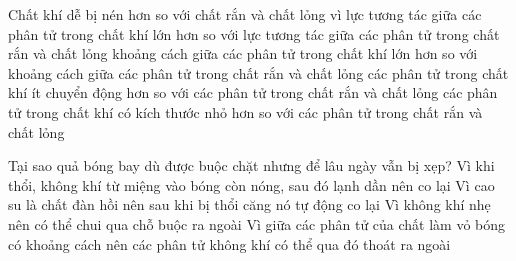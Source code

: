\begin{ex} 
	Chất khí dễ bị nén hơn so với chất rắn và chất lỏng vì
	\choice
	{lực tương tác giữa các phân tử trong chất khí lớn hơn so với lực tương tác giữa các phân tử trong chất rắn và chất lỏng}
	{\True khoảng cách giữa các phân tử trong chất khí lớn hơn so với khoảng cách giữa các phân tử trong chất rắn và chất lỏng}
	{các phân tử trong chất khí ít chuyển động hơn so với các phân tử trong chất rắn và chất lỏng}
	{các phân tử trong chất khí có kích thước nhỏ hơn so với các phân tử trong chất rắn và chất lỏng}
\end{ex}







\begin{ex}
	Tại sao quả bóng bay dù được buộc chặt nhưng để lâu ngày vẫn bị xẹp?	
	\choice
	{Vì khi thổi, không khí từ miệng vào bóng còn nóng, sau đó lạnh dần nên co lại}
	{Vì cao su là chất đàn hồi nên sau khi bị thổi căng nó tự động co lại}
	{Vì không khí nhẹ nên có thể chui qua chỗ buộc ra ngoài}
	{\True Vì giữa các phân tử của chất làm vỏ bóng có khoảng cách nên các phân tử không khí có thể qua đó thoát ra ngoài}
	\end{ex}
	























